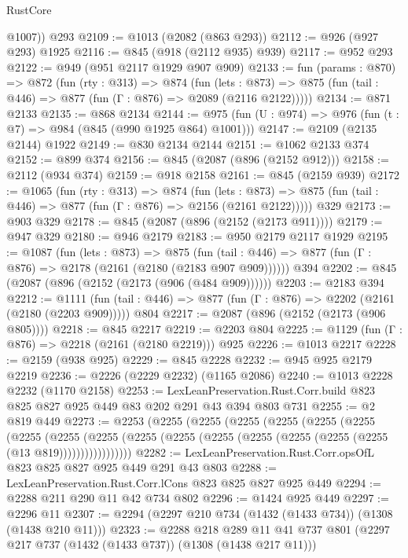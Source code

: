 \begin{lexlean}{RustCore}
\begin{coremodule}
        @1007))
    @293
@2109 := @1013 (@2082 (@863 @293))
@2112 := @926 (@927 @293) @1925
@2116 := @845 (@918 (@2112 @935) @939)
@2117 := @952 @293
@2122 := @949 (@951 @2117 @1929 @907 @909)
@2133 := fun (params : @870) =>
  @872
    (fun (rty : @313) =>
    @874
      (fun (lets : @873) =>
      @875 (fun (tail : @446) => @877 (fun (Γ : @876) => @2089 (@2116 @2122)))))
@2134 := @871 @2133
@2135 := @868 @2134
@2144 := @975 (fun (U : @974) => @976 (fun (t : @7) => @984 (@845 (@990 @1925 @864) @1001)))
@2147 := @2109 (@2135 @2144) @1922
@2149 := @830 @2134 @2144
@2151 := @1062 @2133 @374
@2152 := @899 @374
@2156 := @845 (@2087 (@896 (@2152 @912)))
@2158 := @2112 (@934 @374)
@2159 := @918 @2158
@2161 := @845 (@2159 @939)
@2172 := @1065
    (fun (rty : @313) =>
    @874
      (fun (lets : @873) =>
      @875 (fun (tail : @446) => @877 (fun (Γ : @876) => @2156 (@2161 @2122)))))
    @329
@2173 := @903 @329
@2178 := @845 (@2087 (@896 (@2152 (@2173 @911))))
@2179 := @947 @329
@2180 := @946 @2179
@2183 := @950 @2179 @2117 @1929
@2195 := @1087
    (fun (lets : @873) =>
    @875 (fun (tail : @446) => @877 (fun (Γ : @876) => @2178 (@2161 (@2180 (@2183 @907 @909))))))
    @394
@2202 := @845 (@2087 (@896 (@2152 (@2173 (@906 (@484 @909))))))
@2203 := @2183 @394
@2212 := @1111
    (fun (tail : @446) => @877 (fun (Γ : @876) => @2202 (@2161 (@2180 (@2203 @909)))))
    @804
@2217 := @2087 (@896 (@2152 (@2173 (@906 @805))))
@2218 := @845 @2217
@2219 := @2203 @804
@2225 := @1129 (fun (Γ : @876) => @2218 (@2161 (@2180 @2219))) @925
@2226 := @1013 @2217
@2228 := @2159 (@938 @925)
@2229 := @845 @2228
@2232 := @945 @925 @2179 @2219
@2236 := @2226 (@2229 @2232) (@1165 @2086)
@2240 := @1013 @2228 @2232 (@1170 @2158)
@2253 := LexLeanPreservation.Rust.Corr.build
    @823
    @825
    @827
    @925
    @449
    @83
    @202
    @291
    @43
    @394
    @803
    @731
@2255 := @2 @819 @449
@2273 := @2253
    (@2255
      (@2255
        (@2255
          (@2255
            (@2255
              (@2255
                (@2255
                  (@2255
                    (@2255
                      (@2255 (@2255 (@2255 (@2255 (@2255 (@2255 (@2255 (@13 @819)))))))))))))))))
@2282 := LexLeanPreservation.Rust.Corr.opsOfL @823 @825 @827 @925 @449 @291 @43 @803
@2288 := LexLeanPreservation.Rust.Corr.lCons @823 @825 @827 @925 @449
@2294 := @2288 @211 @290 @11 @42 @734 @802
@2296 := @1424 @925 @449
@2297 := @2296 @11
@2307 := @2294 (@2297 @210 @734 (@1432 (@1433 @734)) (@1308 (@1438 @210 @11)))
@2323 := @2288
    @218
    @289
    @11
    @41
    @737
    @801
    (@2297 @217 @737 (@1432 (@1433 @737)) (@1308 (@1438 @217 @11)))

\end{coremodule}
\end{lexlean}
